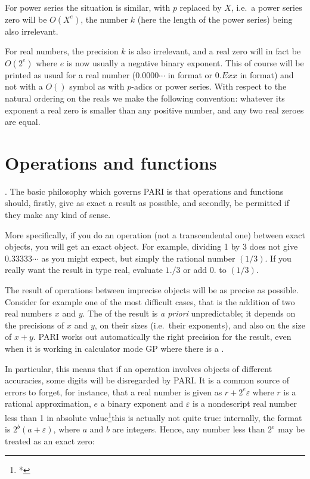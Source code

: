 For power series the situation is similar, with $p$ replaced by $X$, i.e.~a
power series zero will be $O(X^e)$, the number $k$ (here the length of the
power series) being also irrelevant.\label{se:whatzero}

For real numbers, the precision $k$ is also irrelevant, and a real zero will
in fact be $O(2^e)$ where $e$ is now usually a negative binary exponent. This
of course will be printed as usual for a real number ($0.0000\cdots$ in
 format or $0.Exx$ in  format) and not with a $O()$ symbol as
with $p$-adics or power series. With respect to the natural ordering on the
reals we make the following convention: whatever its exponent a real
zero is smaller than any positive number, and any two real zeroes are equal.

\section{Operations and functions}

.
The basic philosophy which governs PARI is that operations and functions
should, firstly, give as exact a result as possible, and secondly, be
permitted if they make any kind of sense.

More specifically, if you do an operation (not a transcendental one) between
exact objects, you will get an exact object. For example, dividing 1 by 3
does not give $0.33333\cdots$ as you might expect, but simply the rational
number $(1/3)$. If you really want the result in type real, evaluate $1./3$
or add $0.$ to $(1/3)$.

The result of operations between imprecise objects will be as precise as
possible. Consider for example one of the most difficult cases, that is the
addition of two real numbers $x$ and $y$. The  of the result is
{\it a priori\/} unpredictable; it depends on the precisions of $x$ and $y$,
on their sizes (i.e.~their exponents), and also on the size of $x+y$. PARI
works out automatically the right precision for the result, even when it is
working in calculator mode GP where there is a .

In particular, this means that if an operation involves objects of
different accuracies, some digits will be disregarded by PARI. It is a
common source of errors to forget, for instance, that a real number is
given as $r + 2^e \varepsilon$ where $r$ is a rational approximation, $e$ a
binary exponent and $\varepsilon$ is a nondescript real number less than 1 in
absolute value\footnote{*}{this is actually not quite true: internally, the
format is $2^b (a + \varepsilon)$, where $a$ and $b$ are integers}. Hence,
any number less than $2^e$ may be treated as an exact zero:

